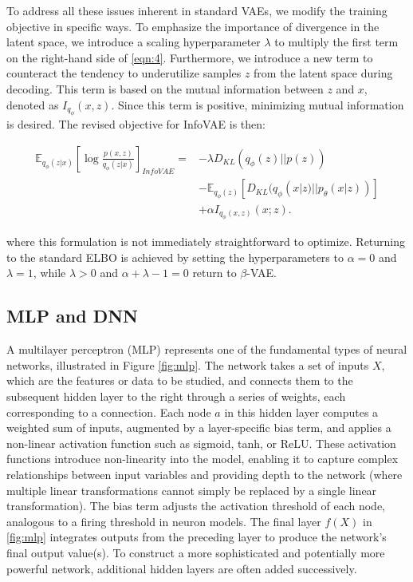 To address all these issues inherent in standard VAEs, we modify the training objective in specific ways. To emphasize the importance of divergence in the latent space, we introduce a scaling hyperparameter $\lambda$ to multiply the first term on the right-hand side of \autoref{eqn:4}. Furthermore, we introduce a new term to counteract the tendency to underutilize samples $z$ from the latent space during decoding. This term is based on the mutual information between $z$ and $x$, denoted as $I_{q_\phi}(x,z)$. Since this term is positive, minimizing mutual information is desired. The revised objective for InfoVAE is then:

\begin{align}
 \mathbb{E}_{q_\phi(z|x)}\left[\log \frac{p(x,z)}{q_\phi(z|x)}  \right]_{InfoVAE}
 =&-\lambda D_{KL}(q_\phi(z)||p(z))\\ \nonumber
 &-\mathbb{E}_{q_\phi(z)}[D_{KL}(q_\phi(x|z)||p_\theta(x|z))]\\ \nonumber
 &+\alpha I_{q_\phi(x,z)}(x;z).
 \label{eqn:4}
\end{align}

where this formulation is not immediately straightforward to optimize. Returning to the standard ELBO is achieved by setting the hyperparameters to $\alpha=0$ and $\lambda=1$, while $\lambda > 0$ and $\alpha+\lambda-1=0$ return to $\beta$-VAE.

\subsection{MLP and DNN}

A multilayer perceptron (MLP) represents one of the fundamental types of neural networks, illustrated in Figure \ref{fig:mlp}. The network takes a set of inputs $X$, which are the features or data to be studied, and connects them to the subsequent hidden layer to the right through a series of weights, each corresponding to a connection. Each node $a$ in this hidden layer computes a weighted sum of inputs, augmented by a layer-specific bias term, and applies a non-linear activation function such as sigmoid, tanh, or ReLU. These activation functions introduce non-linearity into the model, enabling it to capture complex relationships between input variables and providing depth to the network (where multiple linear transformations cannot simply be replaced by a single linear transformation). The bias term adjusts the activation threshold of each node, analogous to a firing threshold in neuron models. The final layer $f(X)$ in \ref{fig:mlp} integrates outputs from the preceding layer to produce the network's final output value(s). To construct a more sophisticated and potentially more powerful network, additional hidden layers are often added successively. 


